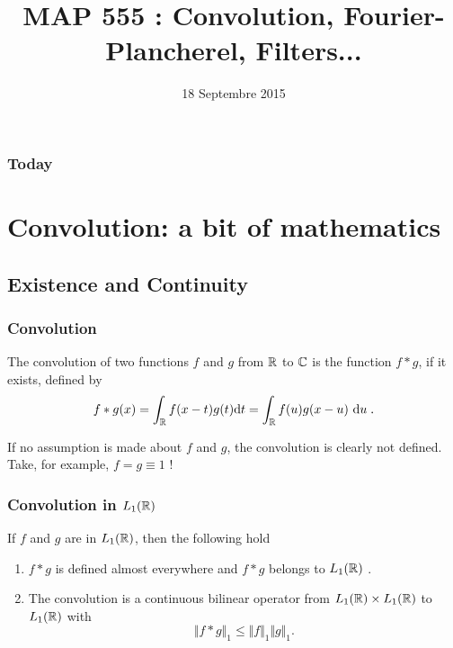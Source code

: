 

\title{MAP 555 : Convolution, Fourier-Plancherel, Filters...}

\date{18 Septembre 2015}
\maketitle



\begin{frame}
\frametitle{Today}
\tableofcontents
\end{frame}

\section{Convolution: a bit of mathematics}
\subsection{Existence and Continuity}
\begin{frame}
\frametitle{Convolution}
\begin{definition}
The convolution of two functions $f$ and $g$ from $\mathbb{R}$ to $\mathbb{C}$ is the function $f*g$, if it exists, defined by
$$
f*g(x)=\int_{\mathbb{R}}f(x-t)g(t) \mathrm{d} t=\int_{\mathbb{R}}f(u)g(x-u)\ \mathrm{d} u \;.
$$
\end{definition}
If no assumption is made about $f$ and $g$, the convolution is clearly not defined. Take, for example, $f=g \equiv 1$ !
\end{frame}

\begin{frame}
\frametitle{Convolution in $L_1(\mathbb{R})$}
\begin{theorem}
If $f$ and $g$ are in $L_1(\mathbb{R})$,  then the following hold
\begin{enumerate}[label=(\roman*)]
\item $f*g$ is  defined almost everywhere and $f*g$  belongs to $L_1(\mathbb{R})$ .
\item The convolution is a  continuous bilinear operator from $L_1(\mathbb{R}) \times L_1(\mathbb{R})$  to $L_1(\mathbb{R})$  with
$$
\Vert f*g\Vert_{1}\leq\Vert f\Vert_{1}\Vert g\Vert_{1}.
$$
\end{enumerate}
\end{theorem}
\end{frame}

